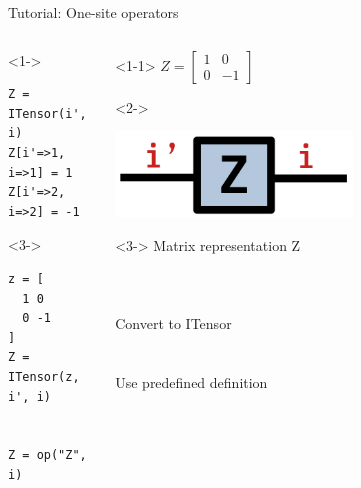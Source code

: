 \begin{frame}[fragile]{Tutorial: One-site operators}

\begin{columns}

\begin{column}{4.5cm}

\begin{onlyenv}<1->
\begin{lstlisting}[language=JuliaLocal, style=julia, basicstyle=\small]
Z = ITensor(i', i)
Z[i'=>1, i=>1] = 1
Z[i'=>2, i=>2] = -1
\end{lstlisting}
\end{onlyenv}

\begin{onlyenv}<3->
\begin{lstlisting}[language=JuliaLocal, style=julia, basicstyle=\small]
z = [
  1 0
  0 -1
]
Z = ITensor(z, i', i)


Z = op("Z", i)
\end{lstlisting}
\end{onlyenv}

\end{column}

\begin{column}{4.5cm}

\begin{onlyenv}<1-1>
$Z = \begin{bmatrix} 1 & 0 \\ 0 & -1 \end{bmatrix}$
\end{onlyenv}

\begin{onlyenv}<2->
\begin{center}
\includegraphics[width=0.6\textwidth]{
  slides/assets/Z.png
}
\end{center}
\vspace*{0.5cm}
\end{onlyenv}

\begin{onlyenv}<3->
Matrix representation Z \\
~\\
~\\
~\\
Convert to ITensor \\
~\\
~\\
Use predefined definition
\end{onlyenv}

\end{column}

\end{columns}

\end{frame}
